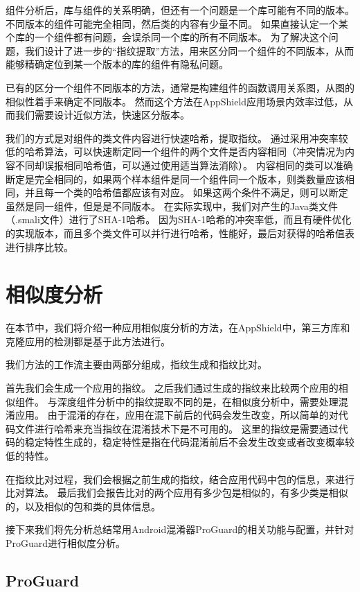 组件分析后，库与组件的关系明确，但还有一个问题是一个库可能有不同的版本。
不同版本的组件可能完全相同，然后类的内容有少量不同。
如果直接认定一个某个库的一个组件都有问题，会误杀同一个库的所有不同版本。
为了解决这个问题，我们设计了进一步的“指纹提取”方法，用来区分同一个组件的不同版本，从而能够精确定位到某一个版本的库的组件有隐私问题。

已有的区分一个组件不同版本的方法，通常是构建组件的函数调用关系图，从图的相似性着手来确定不同版本。
然而这个方法在AppShield应用场景内效率过低，从而我们需要设计近似方法，快速区分版本。

我们的方式是对组件的类文件内容进行快速哈希，提取指纹。
通过采用冲突率较低的哈希算法，可以快速断定同一个组件的两个文件是否内容相同（冲突情况为内容不同却误报相同哈希值，可以通过使用适当算法消除）。
内容相同的类可以准确断定是完全相同的，如果两个样本组件是同一个组件同一个版本，则类数量应该相同，并且每一个类的哈希值都应该有对应。
如果这两个条件不满足，则可以断定虽然是同一组件，但是是不同版本。
在实际实现中，我们对产生的Java类文件（.smali文件）进行了SHA-1哈希。
因为SHA-1哈希的冲突率低，而且有硬件优化的实现版本，而且多个类文件可以并行进行哈希，性能好，最后对获得的哈希值表进行排序比较。

\section{相似度分析}
\label{sec:appshield:sim-analysis}

在本节中，我们将介绍一种应用相似度分析的方法，在AppShield中，第三方库和克隆应用的检测都是基于此方法进行。

我们方法的工作流主要由两部分组成，指纹生成和指纹比对。

首先我们会生成一个应用的指纹。
之后我们通过生成的指纹来比较两个应用的相似组件。
与深度组件分析中的指纹提取不同的是，在相似度分析中，需要处理混淆应用。
由于混淆的存在，应用在混下前后的代码会发生改变，所以简单的对代码文件进行哈希来充当指纹在混淆技术下是不可用的。
这里的指纹是需要通过代码的稳定特性生成的，稳定特性是指在代码混淆前后不会发生改变或者改变概率较低的特性。

在指纹比对过程，我们会根据之前生成的指纹，结合应用代码中包的信息，来进行比对算法。
最后我们会报告比对的两个应用有多少包是相似的，有多少类是相似的，以及相似的包和类的具体信息。

接下来我们将先分析总结常用Android混淆器ProGuard的相关功能与配置，并针对ProGuard进行相似度分析。

\subsection{ProGuard}
\label{sec:appshield:proguard}

